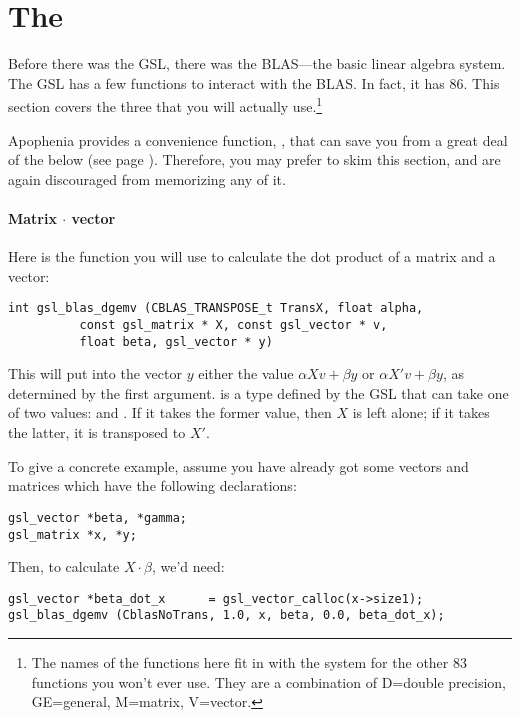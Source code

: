 \section{The } 
 
Before there was the GSL, there was the BLAS---the basic linear algebra
system. The GSL has a few functions to interact with the BLAS. In fact,
it has 86. This section covers the three that you will actually 
use.\footnote{The names of the functions here fit in with the system
for the other 83 functions you won't ever use. They are a combination
of D=double precision, GE=general, M=matrix, V=vector.}

Apophenia provides a convenience function, , that can
save you from a great deal of the below (see page \pageref{apopdot}).
Therefore, you may prefer to skim this section, and are again
discouraged from memorizing any of it.

\paragraph{Matrix $\cdot$ vector} Here is the function you will use to calculate the dot product of a
matrix and a vector:
\begin{lstlisting}
int gsl_blas_dgemv (CBLAS_TRANSPOSE_t TransX, float alpha, 
          const gsl_matrix * X, const gsl_vector * v, 
          float beta, gsl_vector * y)
\end{lstlisting}

This will put into the vector $y$ either the value 
$\alpha X v + \beta y$ or $\alpha X' v + \beta y$, as determined by the
first argument.
 is a type defined by the GSL that can take
one of two values:  and . If
it takes the former value, then $X$ is left alone;
if it takes the latter, it is transposed to $X'$.

To give a concrete example, assume you have already got some vectors and matrices which have the following
declarations:
\begin{lstlisting}
gsl_vector *beta, *gamma;     
gsl_matrix *x, *y;           
\end{lstlisting}

Then, to calculate $X\cdot \beta$, we'd need:

\begin{lstlisting}
gsl_vector *beta_dot_x      = gsl_vector_calloc(x->size1);
gsl_blas_dgemv (CblasNoTrans, 1.0, x, beta, 0.0, beta_dot_x);
\end{lstlisting}

